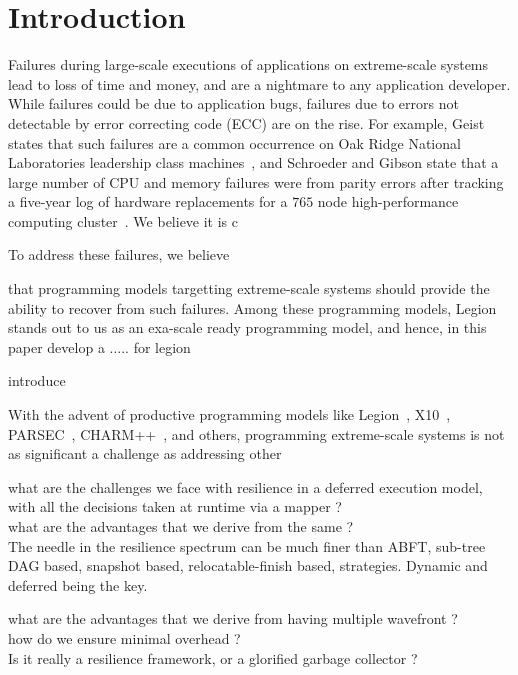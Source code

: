 \section{Introduction}

Failures during large-scale executions of applications on extreme-scale systems
lead to loss of time and money, and are a nightmare to any application
developer. While failures could be due to application bugs, failures due
to errors not detectable by error correcting code (ECC) are on the rise.  For
example, Geist states that such failures are a common occurrence on Oak Ridge
National Laboratories leadership class machines~\cite{errors_ecc}, and
Schroeder and Gibson state that a large number of CPU and memory failures were
from parity errors after tracking a five-year log of hardware replacements for
a $765$ node high-performance computing cluster~\cite{schroeder_gibson}. We 
believe it is c

To address
these failures, we believe 

that programming models targetting extreme-scale systems should provide the ability to recover from such failures. Among these programming models,
Legion stands out to us as an exa-scale ready programming model, and hence, in
this paper develop a ..... for legion


introduce 

With the advent of productive programming models like Legion~\cite{legion}, X10~\cite{x10}, 
PARSEC~\cite{parsec}, CHARM++~\cite{charm++}, and others, programming extreme-scale
systems is not as significant a challenge as addressing other 




what are the challenges we face with resilience in a deferred execution model,
with all the decisions taken at runtime via a mapper ? \\

what are the advantages that we derive from the same ?\\ The needle in the
resilience spectrum can be much finer than ABFT, sub-tree DAG based, snapshot
based, relocatable-finish based, strategies. Dynamic and deferred being the
key.

what are the advantages that we derive from having multiple wavefront ?\\ how
do we ensure minimal overhead ?\\

Is it really a resilience framework, or a glorified garbage collector ?\\


